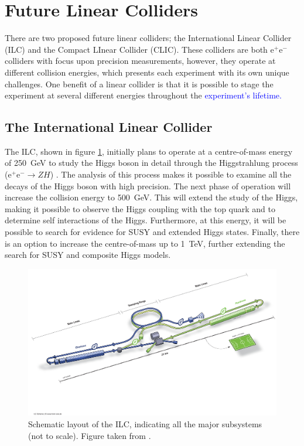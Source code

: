 
\section{Future Linear Colliders}
There are two proposed future linear colliders; the International Linear Collider (ILC) and the Compact LInear Collider (CLIC).  These colliders are both $\text{e}^{+}\text{e}^{-}$ colliders with focus upon precision measurements, however, they operate at different collision energies, which presents each experiment with its own unique challenges.  One benefit of a linear collider is that it is possible to stage the experiment at several different energies throughout the \textcolor{blue}{experiment's lifetime.}


\subsection{The International Linear Collider}
The ILC, shown in figure \ref{fig:ilc}, initially plans to operate at a centre-of-mass energy of 250~GeV to study the Higgs boson in detail through the Higgstrahlung process ($\text{e}^{+}\text{e}^{-} \rightarrow ZH$) \cite{Behnke:2013xla}.  The analysis of this process makes it possible to examine all the decays of the Higgs boson with high precision.  The next phase of operation will increase the collision energy to 500~GeV.  This will extend the study of the Higgs, making it possible to observe the Higgs coupling with the top quark and to determine self interactions of the Higgs.  Furthermore, at this energy, it will be possible to search for evidence for SUSY and extended Higgs states.  Finally, there is an option to increase the centre-of-mass up to 1~TeV, further extending the search for SUSY and composite Higgs models.

\begin{figure}[h!]
\includegraphics[width=1.0\textwidth]{Introduction/Plots/ILC.jpg}
\caption[Schematic layout of the ILC, indicating all the major subsystems (not to scale).  Figure taken from \cite{Behnke:2013xla}.]{Schematic layout of the ILC, indicating all the major subsystems (not to scale).  Figure taken from \cite{Behnke:2013xla}.}
\label{fig:ilc}
\end{figure}

